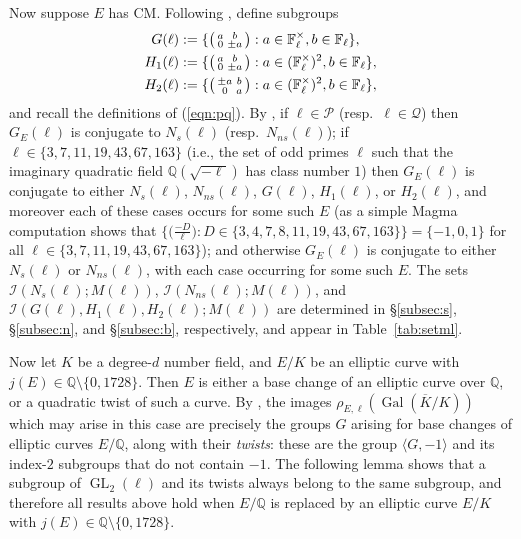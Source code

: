 \documentclass[table,dvipsnames]{amsart}
\newcommand{\F}{\mathbb{F}}
\newcommand{\Q}{\mathbb{Q}}
\newcommand{\Gal}{\operatorname{Gal}}
\newcommand{\GL}{\operatorname{GL}}
\newcommand{\Kbar}{\overline K}
\newcommand{\I}{\mathcal{I}}
\newcommand{\angles}[1]{\langle #1\rangle}
\newcommand{\tLegendre}[2]{\big(\tfrac{#1}{#2}\big)}
\newcommand{\smallmat}[4]{\begin{psmallmatrix}#1&#2\\#3&#4\end{psmallmatrix}}
\numberwithin{equation}{section}
\newcommand{\s}{\textit{s}}
\newcommand{\ns}{\textit{ns}}
\newcommand{\Ns}{N_\s}
\newcommand{\Nns}{N_\ns}
\begin{document}
Now suppose $E$ has CM. Following \cite{zywina2015}, define subgroups
\begin{align*}
G(\ell)&:=\{\smallmat{a}{b}{0}{\pm a}:a\in\F_\ell^\times,b\in\F_\ell\},\\
H_1(\ell)&:=\{\smallmat{a}{b}{0}{\pm a}:a\in(\F_\ell^\times)^2,b\in\F_\ell\},\\
H_2(\ell)&:=\{\smallmat{\pm a}{b}{0}{a}:a\in(\F_\ell^\times)^2,b\in\F_\ell\},
\end{align*}
and recall the definitions of (\ref{eqn:pq}). By \cite[Prop.~1.14]{zywina2015}, if $\ell\in\mathcal{P}$ (resp.\ $\ell\in\mathcal{Q}$) then $G_E(\ell)$ is conjugate to $\Ns(\ell)$ (resp.\ $\Nns(\ell)$); if $\ell\in\{3,7,11,19,43,67,163\}$ (i.e., the set of odd primes $\ell$ such that the imaginary quadratic field $\Q(\sqrt{-\ell})$ has class number $1$) then $G_E(\ell)$ is conjugate to either $\Ns(\ell)$, $\Nns(\ell)$, $G(\ell)$, $H_1(\ell)$, or $H_2(\ell)$, and moreover each of these cases occurs for some such $E$ (as a simple Magma computation \cite{code} shows that $\big\{\tLegendre{-D}{\ell}:D\in\{3,4,7,8,11,19,43,67,163\}\big\}=\{-1,0,1\}$ for all $\ell\in\{3,7,11,19,43,67,163\}$); and otherwise $G_E(\ell)$ is conjugate to either $\Ns(\ell)$ or $\Nns(\ell)$, with each case occurring for some such $E$. The sets $\I(\Ns(\ell);M(\ell))$, $\I(\Nns(\ell);M(\ell))$, and $\I(G(\ell),H_1(\ell),H_2(\ell);M(\ell))$ are determined in \S\ref{subsec:s}, \S\ref{subsec:n}, and \S\ref{subsec:b}, respectively, and appear in Table~\ref{tab:setml}.

Now let $K$ be a degree-$d$ number field, and $E/K$ be an elliptic curve with $j(E)\in\Q\setminus\{0,1728\}$. Then $E$ is either a base change of an elliptic curve over $\Q$, or a quadratic twist of such a curve. By \cite[Cor.~5.25]{sutherland2016}, the images $\rho_{E,\ell}(\Gal(\Kbar/K))$ which may arise in this case are precisely the groups $G$ arising for base changes of elliptic curves $E/\Q$, along with their \emph{twists}: these are the group $\angles{G,-1}$ and its index-$2$ subgroups that do not contain $-1$. The following lemma shows that a subgroup of $\GL_2(\ell)$ and its twists always belong to the same subgroup, and therefore all results above hold when $E/\Q$ is replaced by an elliptic curve $E/K$ with $j(E)\in\Q\setminus\{0,1728\}$.
\end{document}
